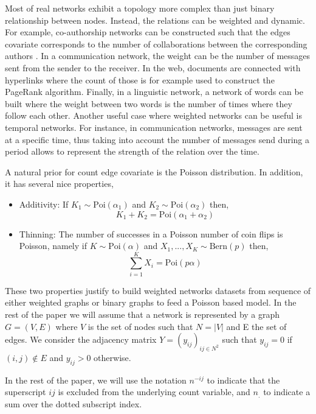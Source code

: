 Most of real networks exhibit a topology more complex than just binary relationship between nodes. Instead, the relations can be weighted and dynamic. For example, co-authorship networks can be constructed such that the edges covariate corresponds to the number of collaborations between the corresponding authors \cite{newman2001scientific}. In a communication network, the weight can be the number of messages sent from the sender to the receiver. In the web, documents are connected with hyperlinks where the count of those is for example used to construct the PageRank algorithm. Finally, in a linguistic network, a network of words can be built where the weight between two words is the number of times where they follow each other. Another useful case where weighted networks can be useful is temporal networks. For instance, in communication networks, messages are sent at a specific time, thus taking into account the number of messages send during a period allows to represent the strength of the relation over the time.


A natural prior for count edge covariate is the Poisson distribution. In addition, it has several nice properties,

\begin{itemize}
\item{Additivity}: If $K_1 \sim \mathrm{Poi}(\alpha_1)$ and $K_2 \sim \mathrm{Poi}(\alpha_2)$ then,
    \begin{equation*}
        K_1 + K_2 = \mathrm{Poi}(\alpha_1 + \alpha_2)
    \end{equation*}
\item {Thinning}: The number of successes in a Poisson number of coin flips is Poisson, namely if $K \sim \mathrm{Poi}(\alpha)$ and $X_1,...,X_K \sim \mathrm{Bern}(p)$ then,
    \begin{equation*}
        \sum_{i=1}^K X_i = \mathrm{Poi}(p\alpha)
    \end{equation*}
\end{itemize}

These two properties justify to build weighted networks datasets from sequence of either weighted graphs or binary graphs to feed a Poisson based model. In the rest of the paper we will assume that a network is represented by a graph $G=(V,E)$ where $V$ is the set of nodes such that $N=|V|$ and E the set of edges. We consider the adjacency matrix $Y=(y_{ij})_{ij\in N^2}$ such that $y_{ij}=0$ if $(i,j) \notin E$ and $y_{ij} > 0$ otherwise.

In the rest of the paper, we will use the notation $n^{-ij}$ to indicate that the superscript $ij$ is excluded from the underlying count variable, and $n_{\bm{.}}$ to indicate a sum over the dotted subscript index.


